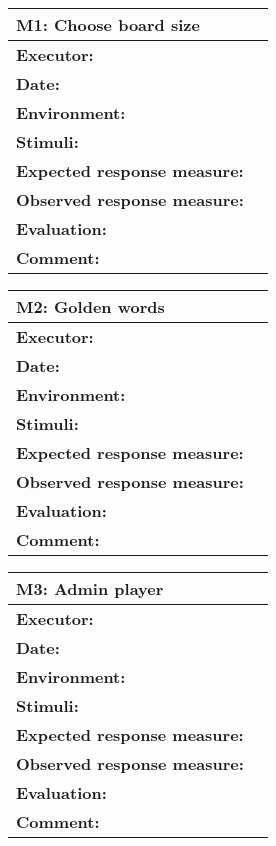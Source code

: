 \begin{tabular}{|m{}||m{}|}
\hline
\multicolumn{2}{|l|}{M1: Choose board size} \\ \hline
\textbf{Executor:} & \\ \hline
\textbf{Date:} & \\ \hline
\textbf{Environment:} & \\ \hline
\textbf{Stimuli:} & \\ \hline
\textbf{Expected response measure:} & \\ \hline
\textbf{Observed response measure:} & \\ \hline
\textbf{Evaluation:} & \\ \hline
\textbf{Comment:} & \\ \hline
\end{tabular}

\begin{tabular}{|m{}||m{}|}
\hline
\multicolumn{2}{|l|}{M2: Golden words} \\ \hline
\textbf{Executor:} & \\ \hline
\textbf{Date:} & \\ \hline
\textbf{Environment:} & \\ \hline
\textbf{Stimuli:} & \\ \hline
\textbf{Expected response measure:} & \\ \hline
\textbf{Observed response measure:} & \\ \hline
\textbf{Evaluation:} & \\ \hline
\textbf{Comment:} & \\ \hline
\end{tabular}

\begin{tabular}{|m{}||m{}|}
\hline
\multicolumn{2}{|l|}{M3: Admin player} \\ \hline
\textbf{Executor:} & \\ \hline
\textbf{Date:} & \\ \hline
\textbf{Environment:} & \\ \hline
\textbf{Stimuli:} & \\ \hline
\textbf{Expected response measure:} & \\ \hline
\textbf{Observed response measure:} & \\ \hline
\textbf{Evaluation:} & \\ \hline
\textbf{Comment:} & \\ \hline
\end{tabular}



